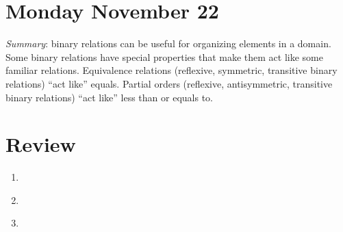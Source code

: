 

\section*{Monday November 22}




\newpage


\vfill


\vfill


\vfill


\vfill
\newpage

\newpage




\vfill

{\it Summary}: binary relations can be useful for organizing elements in a domain. 
Some binary relations have special properties that make them act like some familiar relations.
Equivalence relations (reflexive, symmetric, transitive binary relations) ``act like'' equals.
Partial orders (reflexive, antisymmetric, transitive binary relations) ``act like'' less than or equals to.
\newpage
\section*{Review}
\begin{enumerate}
    \item \hspace{1in}\\  
    \item \hspace{1in}\\ 
    \item \hspace{1in}\\ 
\end{enumerate}
\newpage

